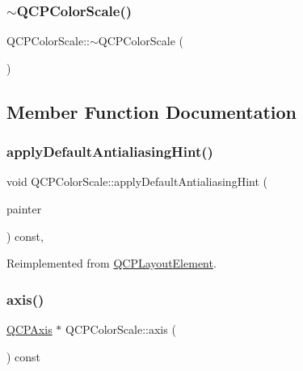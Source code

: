 \subsubsection{\texorpdfstring{$\sim$\+Q\+C\+P\+Color\+Scale()}{~QCPColorScale()}}
{\footnotesize\ttfamily Q\+C\+P\+Color\+Scale\+::$\sim$\+Q\+C\+P\+Color\+Scale (\begin{DoxyParamCaption}{ }\end{DoxyParamCaption})\hspace{0.3cm}{\ttfamily [virtual]}}



\subsection{Member Function Documentation}
\mbox{\label{class_q_c_p_color_scale_af1b24d24a70f25b65d29f09e413390a8}} 
\subsubsection{\texorpdfstring{apply\+Default\+Antialiasing\+Hint()}{applyDefaultAntialiasingHint()}}
{\footnotesize\ttfamily void Q\+C\+P\+Color\+Scale\+::apply\+Default\+Antialiasing\+Hint (\begin{DoxyParamCaption}\item[{\hyperlink{class_q_c_p_painter}{Q\+C\+P\+Painter} $\ast$}]{painter }\end{DoxyParamCaption}) const\hspace{0.3cm}{\ttfamily [protected]}, {\ttfamily [virtual]}}



Reimplemented from \hyperlink{class_q_c_p_layout_element_a0a8f18141bcf46cf40ad4c13324ff346}{Q\+C\+P\+Layout\+Element}.

\mbox{\label{class_q_c_p_color_scale_a39bdbdb3b212602a5a57f9f3ea444190}} 
\subsubsection{\texorpdfstring{axis()}{axis()}}
{\footnotesize\ttfamily \hyperlink{class_q_c_p_axis}{Q\+C\+P\+Axis} $\ast$ Q\+C\+P\+Color\+Scale\+::axis (\begin{DoxyParamCaption}{ }\end{DoxyParamCaption}) const\hspace{0.3cm}{\ttfamily [inline]}}

